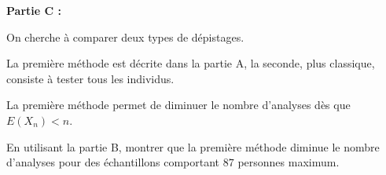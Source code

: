 \bigskip

\textbf{Partie C :}

\medskip

On cherche à comparer deux types de dépistages. 

La première méthode est décrite dans la partie A, la seconde, plus classique, consiste à tester tous les individus. 

La première méthode permet de diminuer le nombre d'analyses dès que $E\left(X_n\right)  < n$.

En utilisant la partie B, montrer que la première méthode diminue le nombre d'analyses pour des échantillons comportant $87$ personnes maximum.

\bigskip

